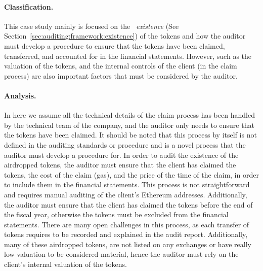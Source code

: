 \paragraph{Classification.} This case study mainly is focused on the ~\textit{existence} (See Section~\ref{sec:auditing:framework:existence}) of the tokens and how the auditor must develop a procedure to ensure that the tokens have been claimed, transferred, and accounted for in the financial statements. However, such as the valuation of the tokens, and the internal controls of the client (in the claim process) are also important factors that must be considered by the auditor.

\paragraph{Analysis.} In here we assume all the technical details of the claim process has been handled by the technical team of the company, and the auditor only needs to ensure that the tokens have been claimed. It should be noted that this process by itself is not defined in the auditing standards or procedure and is a novel process that the auditor must develop a procedure for. In order to audit the existence of the airdropped tokens, the auditor must ensure that the client has claimed the tokens, the cost of the claim (gas), and the price of the time of the claim, in order to include them in the financial statements.  This process is not straightforward and requires manual auditing of the client's Ethereum addresses. Additionally, the auditor must ensure that the client has claimed the tokens before the end of the fiscal year, otherwise the tokens must be excluded from the financial statements. There are many open challenges in this process, as each transfer of tokens requires to be recorded and explained in the audit report. Additionally, many of these airdropped tokens, are not listed on any exchanges or have really low valuation to be considered material, hence the auditor must rely on the client's internal valuation of the tokens. 







